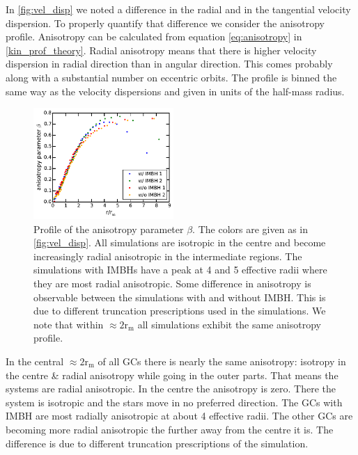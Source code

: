 \par In \ref{fig:vel_disp} we noted a difference in the radial and in the tangential velocity dispersion. To properly quantify that difference we consider the anisotropy profile. Anisotropy can be calculated from equation \eqref{eq:anisotropy} in \ref{kin_prof_theory}.  Radial anisotropy means that there is higher velocity dispersion in radial direction than in angular direction. This comes probably along with a substantial number on eccentric orbits. The profile is binned the same way as the velocity dispersions and given in units of the half-mass radius.
\begin{figure}[htbp]
	\centering
	\includegraphics[width=0.475\textwidth]{Plots/anisotropy_parameter_beta.pdf}
	\caption{Profile of the anisotropy parameter \(\beta\). The colors are given as in \ref{fig:vel_disp}. All simulations are isotropic in the centre and become increasingly radial anisotropic in the intermediate regions. The simulations with \acp{IMBH} have a peak at 4 and 5 effective radii where they are most radial anisotropic. Some difference in anisotropy is observable between the simulations with and without \ac{IMBH}. This is due to different truncation prescriptions used in the simulations. We note that within \(\approx 2\mathrm{r_m}\) all simulations exhibit the same anisotropy profile.}
	\label{fig:anisotropy_param}
\end{figure}
In the central \(\approx 2\mathrm{r_m}\) of all \acp{GC} there is nearly the same anisotropy: isotropy in the centre \& radial anisotropy while going in the outer parts. That means the systems are radial anisotropic. In the centre the anisotropy is zero. There the system is isotropic and the stars move in no preferred direction. The \acp{GC} with \ac{IMBH} are most radially anisotropic at about 4 effective radii. The other \acp{GC} are becoming more radial anisotropic the further away from the centre it is. The difference is due to different truncation prescriptions of the simulation.

